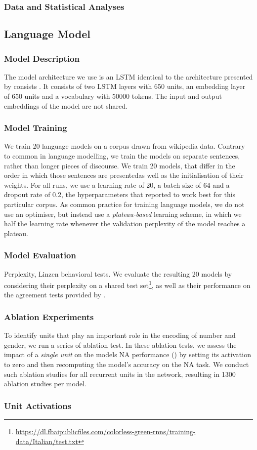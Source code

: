 \subsubsection{Data and Statistical Analyses}


\subsection{Language Model}

\subsubsection{Model Description}

The model architecture we use is an LSTM identical to the architecture presented by consists \citet{Gulordava:etal:2018}.
It consists of two LSTM layers with 650 units, an embedding layer of 650 units and a vocabulary with 50000 tokens.
The input and output embeddings of the model are not shared.

\subsubsection{Model Training} 
We train 20 language models on a corpus drawn from wikipedia data.
Contrary to common in language modelling, we train the models on separate sentences, rather than longer pieces of discourse.
We train 20 models, that differ in the order in which those sentences are presentedas well as the initialisation of their weights.
For all runs, we use a learning rate of 20, a batch size of 64 and a dropout rate of 0.2, the hyperparameters that \citet{Gulordava:etal:2018} reported to work best for this particular corpus.
As common practice for training language models, we do not use an optimiser, but instead use a \emph{plateau-based} learning scheme, in which we half the learning rate whenever the validation perplexity of the model reaches a plateau.

\subsubsection{Model Evaluation} Perplexity, Linzen behavioral tests.
We evaluate the resulting 20 models by considering their perplexity on a shared test set\footnote{\url{https://dl.fbaipublicfiles.com/colorless-green-rnns/training-data/Italian/test.txt}}, as well as their performance on the agreement tests provided by \citet{}.

\subsubsection{Ablation Experiments}
To identify units that play an important role in the encoding of number and gender, we run a series of ablation test.
In these ablation tests, we assess the impact of a \emph{single unit} on the models NA performance () by setting its activation to zero and then recomputing the model's accuracy on the NA task. 
We conduct such ablation studies for all recurrent units in the network, resulting in 1300 ablation studies per model.

\subsubsection{Unit Activations}


